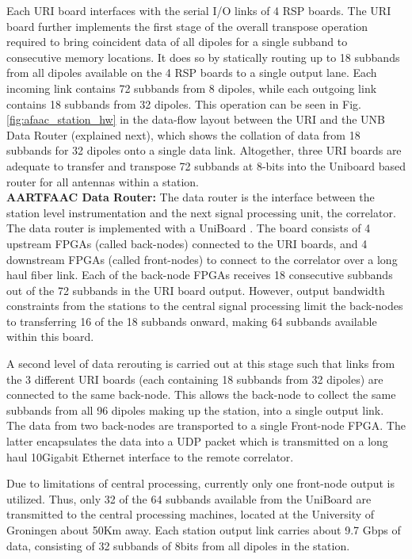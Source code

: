 \documentclass{ws-jai}
\begin{document}
Each URI board  interfaces with the serial  I/O links of 4 RSP  boards.  The URI
board  further implements  the first  stage of  the overall  transpose operation
required  to bring  coincident  data of  all  dipoles for  a  single subband  to
consecutive  memory locations.   It  does  so by  statically  routing  up to  18
subbands from all dipoles available on the 4 RSP boards to a single output lane.
Each incoming link contains 72 subbands from 8 dipoles, while each outgoing link
contains  18  subbands  from  32  dipoles.    This  operation  can  be  seen  in
Fig. \ref{fig:afaac_station_hw} in the data-flow  layout between the URI and the
UNB Data  Router (explained  next), which  shows the collation  of data  from 18
subbands for 32  dipoles onto a single data link.   Altogether, three URI boards
are adequate to  transfer and transpose 72 subbands at  8-bits into the Uniboard
based router for all antennas within a station.\\

\noindent  \textbf {AARTFAAC  Data Router:}  The  data router  is the  interface
between the station  level instrumentation and the next  signal processing unit,
the   correlator.    The   data   router  is   implemented   with   a   UniBoard
\citep{gunst2014application}.  The  board consists  of 4 upstream  FPGAs (called
back-nodes)  connected  to  the  URI  boards, and  4  downstream  FPGAs  (called
front-nodes) to connect to  the correlator over a long haul  fiber link. Each of
the back-node FPGAs  receives 18 consecutive subbands out of  the 72 subbands in
the URI board  output.  However, output bandwidth constraints  from the stations
to the central signal processing limit  the back-nodes to transferring 16 of the
18 subbands onward, making 64 subbands available within this board.

A second level  of data rerouting is  carried out at this stage  such that links
from the  3 different URI boards  (each containing 18 subbands  from 32 dipoles)
are connected to  the same back-node.  This allows the  back-node to collect the
same subbands from  all 96 dipoles making  up the station, into  a single output
link.  The data from two back-nodes are transported to a single Front-node FPGA.
The latter  encapsulates the data  into a UDP packet  which is transmitted  on a
long  haul 10Gigabit  Ethernet interface  to  the remote  correlator.  

Due to limitations  of central processing, currently only  one front-node output
is utilized. Thus,  only 32 of the  64 subbands available from  the UniBoard are
transmitted to  the central  processing machines, located  at the  University of
Groningen about 50Km  away.  Each station output link carries  about 9.7 Gbps of
data, consisting of 32 subbands of 8bits from all dipoles in the station.\\
\end{document}
